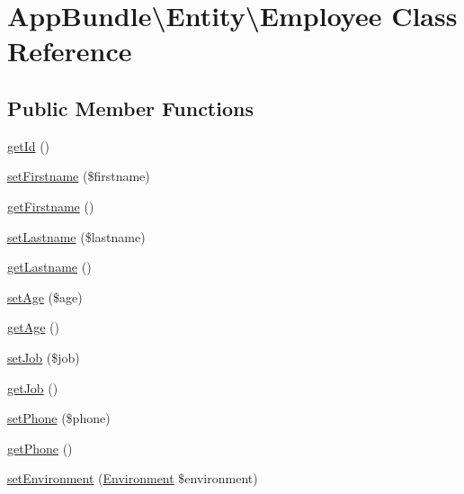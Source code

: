 \hypertarget{class_app_bundle_1_1_entity_1_1_employee}{}\section{App\+Bundle\textbackslash{}Entity\textbackslash{}Employee Class Reference}
\label{class_app_bundle_1_1_entity_1_1_employee}
\subsection*{Public Member Functions}
\begin{DoxyCompactItemize}
\item 
\mbox{\hyperlink{class_app_bundle_1_1_entity_1_1_employee_a8a71f05623bc36531c265d4687907530}{get\+Id}} ()
\item 
\mbox{\hyperlink{class_app_bundle_1_1_entity_1_1_employee_a26c8846a99373bcfc48e48ba828ed638}{set\+Firstname}} (\$firstname)
\item 
\mbox{\hyperlink{class_app_bundle_1_1_entity_1_1_employee_a113700e4ca507530c4d36f9dd9b3e1f8}{get\+Firstname}} ()
\item 
\mbox{\hyperlink{class_app_bundle_1_1_entity_1_1_employee_a2df5450a8b6fa806ab2eb0fca83c8adb}{set\+Lastname}} (\$lastname)
\item 
\mbox{\hyperlink{class_app_bundle_1_1_entity_1_1_employee_a0531339740880fea55260af8a4d47628}{get\+Lastname}} ()
\item 
\mbox{\hyperlink{class_app_bundle_1_1_entity_1_1_employee_a1eaa0241464490a7b907de2b86ccee0e}{set\+Age}} (\$age)
\item 
\mbox{\hyperlink{class_app_bundle_1_1_entity_1_1_employee_aa2f51fb4f112bb2b96f58d4d13f2d556}{get\+Age}} ()
\item 
\mbox{\hyperlink{class_app_bundle_1_1_entity_1_1_employee_a65a7565c426fdea00b46bb5453f75465}{set\+Job}} (\$job)
\item 
\mbox{\hyperlink{class_app_bundle_1_1_entity_1_1_employee_ab3315de55e8e5285ec30ef7e21db7590}{get\+Job}} ()
\item 
\mbox{\hyperlink{class_app_bundle_1_1_entity_1_1_employee_a32ca49cdd8a94c7cb916977a3ce5fa71}{set\+Phone}} (\$phone)
\item 
\mbox{\hyperlink{class_app_bundle_1_1_entity_1_1_employee_a7aae3372e50769995ac7ac3f4a5c7ac4}{get\+Phone}} ()
\item 
\mbox{\hyperlink{class_app_bundle_1_1_entity_1_1_employee_abc7b0c40463197bd32bc452e9ffe4407}{set\+Environment}} (\mbox{\hyperlink{class_app_bundle_1_1_entity_1_1_environment}{Environment}} \$environment)

\end{DoxyCompactItemize}
